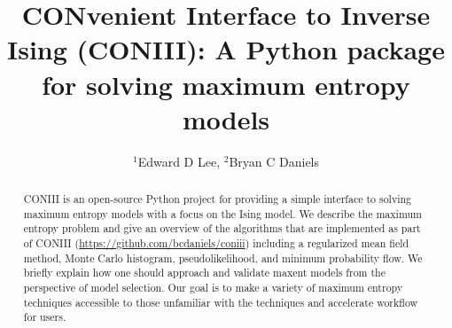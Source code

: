 \documentclass[aps,prl,twocolumn,nofootinbib]{revtex4-1}
\begin{document}
\newcommand{\mr}[1]{\mathrm{#1}}
\newcommand{\mb}[1]{\mathbf{#1}}
\newcommand{\br}[1]{\left<#1\right>}
\newcommand{\bl}[1]{\left|#1\right|}
\newcommand{\mc}[1]{\mathcal{#1}}
\newcommand{\tb}[1]{\textcolor{blue}{#1}}
\newcommand{\tr}[1]{\textcolor{red}{#1}}
\newcommand{\tg}[1]{\textcolor{green}{#1}}
\newcommand{\si}[0]{\sigma_{\rm i}}
\newcommand{\sj}[0]{\sigma_{\rm j}}
\newcommand{\bs}[1]{\boldsymbol{#1}}
\newcommand{\rs}[0]{{\rm s}}
\newcommand{\rk}[0]{{\rm k}}

\title{CONvenient Interface to Inverse Ising (CONIII): A Python package for solving maximum entropy models}
\author{$^1$Edward D Lee, $^2$Bryan C Daniels}

\begin{abstract}
CONIII is an open-source Python project for providing a simple interface to solving maximum entropy models with a focus on the Ising model. We describe the maximum entropy problem and give an overview of the algorithms that are implemented as part of CONIII (\url{https://github.com/bcdaniels/coniii}) including a regularized mean field method, Monte Carlo histogram, pseudolikelihood, and minimum probability flow. We briefly explain how one should approach and validate maxent models from the perspective of model selection. Our goal is to make a variety of maximum entropy techniques accessible to those unfamiliar with the techniques and accelerate workflow for users.
\end{abstract}

\maketitle
\end{document}
